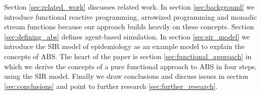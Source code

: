Section \ref{sec:related_work} discusses related work. In section \ref{sec:background} we introduce functional reactive programming, arrowized programming and monadic stream functions because our approach builds heavily on these concepts. Section \ref{sec:defining_abs} defines agent-based simulation. In section \ref{sec:sir_model} we introduce the SIR model of epidemiology as an example model to explain the concepts of ABS. The heart of the paper is section \ref{sec:functional_approach} in which we derive the concepts of a pure functional approach to ABS in four steps, using the SIR model. Finally we draw conclusions and discuss issues in section \ref{sec:conclusions} and point to further research \ref{sec:further_research}.

